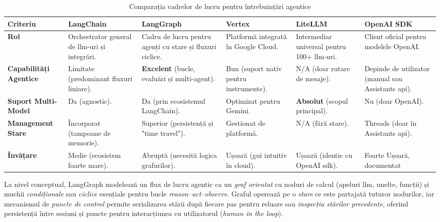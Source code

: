 \documentclass[12pt, a4paper, oneside, romanian]{teza-upb}
\begin{document}
  \begin{table}[H]
  \centering
  \footnotesize
  \setlength{\tabcolsep}{4pt}
  \renewcommand{\arraystretch}{1.25}
    \begin{tabularx}{\textwidth}{@{} >{\RaggedRight}X >{\RaggedRight}X >{\RaggedRight}X >{\RaggedRight}X >{\RaggedRight}X >{\RaggedRight}X @{}}
      \toprule
      \textbf{Criteriu} & \textbf{LangChain~\cite{web_langchain}} & \textbf{LangGraph~\cite{web_langgraph}} & \textbf{Vertex~\cite{web_vertex_ai}} & \textbf{LiteLLM~\cite{web_litellm}} & \textbf{OpenAI SDK~\cite{gh_openai_python}} \\
      \midrule
      \textbf{Rol} & Orchestrator general de \ac{llm}-uri și integrări. & Cadru de lucru pentru agenți cu stare și fluxuri ciclice. & Platformă integrată în Google Cloud. & Intermediar universal pentru 100+ \ac{llm}-uri. & Client oficial pentru modelele OpenAI. \\

      \textbf{Capabilități Agentice} & Limitate (predominant fluxuri liniare). & \textbf{Excelent} (bucle, evaluări și multi-agent). & Bun (suport nativ pentru instrumente). & N/A (doar rutare de mesaje). & Depinde de utilizator (manual sau Assistants \ac{api}). \\

      \textbf{Suport Multi-Model} & Da (agnostic). & Da (prin ecosistemul LangChain). & Optimizat pentru Gemini. & \textbf{Absolut} (scopul principal). & Nu (doar OpenAI). \\

      \textbf{Management Stare} & Încorporat (tampoane de memorie). & Superior (persistență și "time travel"). & Gestionat de platformă. & N/A (fără stare). & Threads (doar în Assistants \ac{api}). \\

      \textbf{Învățare} & Medie (ecosistem foarte mare). & Abruptă (necesită logica grafurilor). & Ușoară (\ac{gui} intuitiv în cloud). & Ușoară (identic cu OpenAI \ac{sdk}). & Foarte Ușoară, documentat \\
      \bottomrule
    \end{tabularx}
  \caption{Comparația cadrelor de lucru pentru întrebuințări agentice}
  \label{tab:ai_frameworks}
  \end{table}

  La nivel conceptual, LangGraph modelează un flux de lucru agentic ca un \textit{graf orientat} cu noduri de calcul (apeluri \ac{llm}, unelte, funcții) și muchii \textit{condiționale} sau \textit{ciclice} esențiale pentru bucle \textit{reason--act--observe}. Graful operează pe o \textit{stare} ce este partajată tuturor nodurilor, iar mecanismul de \textit{puncte de control} permite serializarea stării după fiecare pas pentru reluare sau \textit{inspecția stărilor precedente}, oferind persistență între sesiuni și puncte pentru interacțiunea cu utilizatorul (\textit{human in the loop}).
\end{document}
